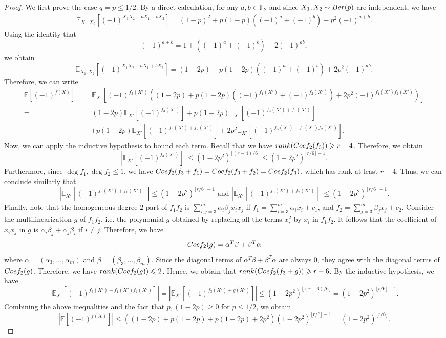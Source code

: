 \documentclass[10pt,a4paper]{amsart}
\newcommand{\Ber}{\textup{Ber}}
\newcommand{\Coef}{\textup{Coef}}
\newcommand{\EE}{\mathbb E}
\newcommand{\FF}{\mathbb F}
\newcommand{\abs}[1]{\left|#1\right|}
\renewcommand{\ge}{\geqslant}
\renewcommand{\geq}{\ge}
\renewcommand{\le}{\leqslant}
\renewcommand{\leq}{\le}
\newcommand{\rank}{\textup{rank}}
\begin{document}
\begin{proof}
    We first prove the case $q=p\leq 1/2$.
    By a direct calculation, for any $a,b\in\FF_2$ and since $X_1,X_2\sim \Ber(p)$ are independent, we have
    \begin{align}\label{eq:Exp}
        \EE_{X_1,X_2}[(-1)^{X_1X_2+aX_1+bX_2}] = (1-p)^2 + p(1-p)((-1)^a+(-1)^b)-p^2(-1)^{a+b}.
    \end{align}
    Using the identity that 
    \[(-1)^{a+b}= 1+((-1)^a + (-1)^b)-2(-1)^{ab},\]
    we obtain
    \begin{equation}
        \EE_{X_1,X_2}[(-1)^{X_1X_2+aX_1+bX_2}] = (1-2p) + p(1-2p)((-1)^a+(-1)^b)+2p^2(-1)^{ab}.
    \end{equation}
    Therefore, we can write
    \begin{align*}
        \EE[(-1)^{f(X)}] =&\,\EE_{X'}\left[(-1)^{f_3(X')}\left((1-2p) + p(1-2p)((-1)^{f_1(X')}+(-1)^{f_2(X')})+2p^2(-1)^{f_1(X')f_2(X')}\right)\right]\\
        =&\,(1-2p)\EE_{X'}\left[(-1)^{f_3(X')}\right]+p(1-2p)\EE_{X'}\left[(-1)^{f_3(X')+f_1(X')}\right]\\
        &+p(1-2p)\EE_{X'}\left[(-1)^{f_3(X')+f_2(X')}\right]+2p^2\EE_{X'}\left[(-1)^{f_3(X')+f_1(X')f_2(X')}\right].
    \end{align*}
    Now, we can apply the inductive hypothesis to bound each term. Recall that we have $\rank(\Coef_2(f_3))\geq r-4$. Therefore, we obtain 
    \[\abs{\EE_{X'}\left[(-1)^{f_3(X')}\right]}\leq (1-2p^2)^{\lfloor(r-4)/6\rfloor}\leq (1-2p^2)^{\lfloor r/6\rfloor-1}.\]
    Furthermore, since $\deg f_1, \deg f_2\le 1$, we have $\Coef_2(f_3+f_1)=\Coef_2(f_3+f_2)=\Coef_2(f_3)$, which has rank at least $r-4$. Thus, we can conclude similarly that
    \[\abs{\EE_{X'}\left[(-1)^{f_3(X')+f_1(X')}\right]}\leq (1-2p^2)^{\lfloor r/6\rfloor-1}\text{ and }\abs{\EE_{X'}\left[(-1)^{f_3(X')+f_2(X')}\right]}\leq (1-2p^2)^{\lfloor r/6\rfloor-1}.\]
    Finally, note that the homogeneous degree $2$ part of $f_1f_2$ is $\sum_{i,j=3}^m\alpha_i\beta_jx_ix_j$ if $f_1=\sum_{i=3}^m\alpha_ix_i+c_1$, and $f_2=\sum_{j=3}^m\beta_jx_j+c_2$. Consider the multilinearization $g$ of $f_1f_2$, i.e. the polynomial $g$ obtained by replacing all the terms $x_i^2$ by $x_i$ in $f_1f_2$. It follows that the coefficient of $x_ix_j$ in $g$ is $\alpha_i\beta_j+\alpha_j\beta_i$ if $i\neq j$. Therefore, we have
    \[\Coef_2(g)=\alpha^T\beta+\beta^T\alpha\]
    where $\alpha=(\alpha_3,\dots,\alpha_m)$ and $\beta=(\beta_3,\dots,\beta_m)$. Since the diagonal terms of $\alpha^T\beta+\beta^T\alpha$ are always $0$, they agree with the diagonal terms of $\Coef_2(g)$.
    Therefore, we have $\rank(\Coef_2(g))\leq 2$. Hence, we obtain that $\rank(\Coef_2(f_3+g))\geq r-6$. By the inductive hypothesis, we have
    \[\abs{\EE_{X'}\left[(-1)^{f_3(X')+f_1(X')f_2(X')}\right]}=\abs{\EE_{X'}\left[(-1)^{f_3(X')+g(X')}\right]}\leq (1-2p^2)^{\lfloor(r-6)/6\rfloor} = (1-2p^2)^{\lfloor r/6\rfloor-1}.\]
    Combining the above inequalities and the fact that $p,(1-2p)\geq 0$ for $p\le 1/2$, we obtain
    \[\abs{\EE[(-1)^{f(X)}]}\leq \left((1-2p)+p(1-2p)+p(1-2p)+2p^2\right)(1-2p^2)^{\lfloor r/6\rfloor-1}=(1-2p^2)^{\lfloor r/6\rfloor}.\]


\end{proof}
\end{document}
